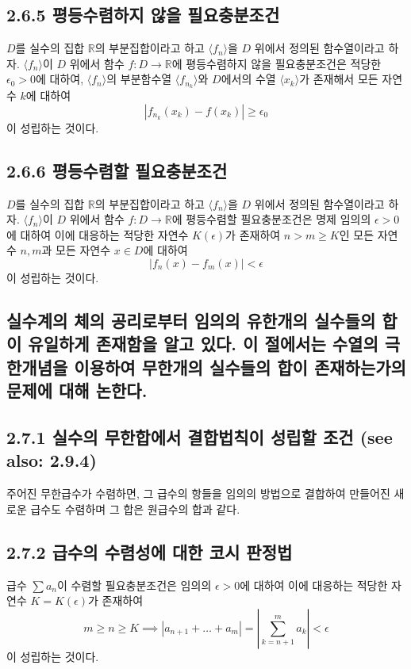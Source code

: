 \documentclass{article}
\begin{document}
\subsection*{\textmd{2.6.5 평등수렴하지 않을 필요충분조건}}
\( D \)를 실수의 집합 \( \mathbb{R} \)의 부분집합이라고 하고 \( \langle f_n \rangle \)을 \( D \) 위에서 정의된 함수열이라고 하자. \( \langle f_n \rangle \)이 \( D \) 위에서 함수 \( f : D \to \mathbb{R} \)에 평등수렴하지 않을 필요충분조건은 
적당한 \( \epsilon_0 > 0 \)에 대하여, \( \langle f_n \rangle \)의 부분함수열 \( \langle f_{n_k} \rangle \)와 \( D \)에서의 수열 \( \langle x_k \rangle \)가 존재해서 모든 자연수 \( k \)에 대하여
\[
| f_{n_k}(x_k) - f(x_k) | \geq \epsilon_0
\]
이 성립하는 것이다.

\subsection*{\textmd{2.6.6 평등수렴할 필요충분조건}}
\( D \)를 실수의 집합 \( \mathbb{R} \)의 부분집합이라고 하고 \( \langle f_n \rangle \)을 \( D \) 위에서 정의된 함수열이라고 하자. \( \langle f_n \rangle \)이 \( D \) 위에서 함수 \( f : D \to \mathbb{R} \)에 평등수렴할 필요충분조건은 명제
임의의 \( \epsilon > 0 \)에 대하여 이에 대응하는 적당한 자연수 \( K(\epsilon) \)가 존재하여 \( n > m \geq K \)인 모든 자연수 \( n, m \)과 모든 자연수 \( x \in D \)에 대하여
\[
| f_n(x) - f_m(x) | < \epsilon
\]
이 성립하는 것이다.

\subsection{\fontsize{11.5}{13}\selectfont 
실수계의 체의 공리로부터 임의의 유한개의 실수들의 합이 유일하게 존재함을 알고 있다. 이 절에서는 수열의 극한개념을 이용하여 무한개의 실수들의 합이 존재하는가의 문제에 대해 논한다.}


\subsection*{\textmd{2.7.1 실수의 무한합에서 결합법칙이 성립할 조건 (see also: 2.9.4)}}
주어진 무한급수가 수렴하면, 그 급수의 항들을 임의의 방법으로 결합하여 만들어진 새로운 급수도 수렴하며 그 합은 원급수의 합과 같다.

\subsection*{\textmd{2.7.2 급수의 수렴성에 대한 코시 판정법}}
급수 \( \sum a_n \)이 수렴할 필요충분조건은 임의의 \( \epsilon > 0 \)에 대하여 이에 대응하는 적당한 자연수 \( K = K(\epsilon) \)가 존재하여
\[
m \geq n \geq K \implies \left| a_{n+1} + \dots + a_m \right| = \left| \sum_{k=n+1}^{m} a_k \right| < \epsilon
\]
이 성립하는 것이다.
\end{document}
